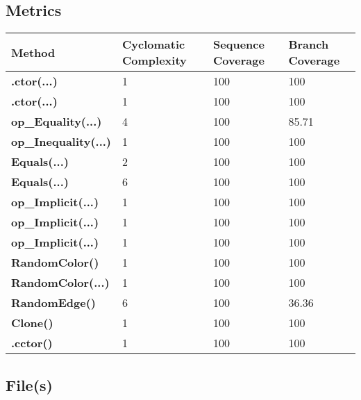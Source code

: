 \documentclass[a4paper,10pt]{article}
\begin{document}
\subsection{Metrics}
\begin{longtable}[l]{|l|l|l|l|}
\hline
\textbf{Method} & \textbf{Cyclomatic Complexity} & \textbf{Sequence Coverage} & \textbf{Branch Coverage}\\
\hline
\textbf{.ctor(...)} & 1 & 100 & 100\\
\hline
\textbf{.ctor(...)} & 1 & 100 & 100\\
\hline
\textbf{op\_Equality(...)} & 4 & 100 & 85.71\\
\hline
\textbf{op\_Inequality(...)} & 1 & 100 & 100\\
\hline
\textbf{Equals(...)} & 2 & 100 & 100\\
\hline
\textbf{Equals(...)} & 6 & 100 & 100\\
\hline
\textbf{op\_Implicit(...)} & 1 & 100 & 100\\
\hline
\textbf{op\_Implicit(...)} & 1 & 100 & 100\\
\hline
\textbf{op\_Implicit(...)} & 1 & 100 & 100\\
\hline
\textbf{RandomColor()} & 1 & 100 & 100\\
\hline
\textbf{RandomColor(...)} & 1 & 100 & 100\\
\hline
\textbf{RandomEdge()} & 6 & 100 & 36.36\\
\hline
\textbf{Clone()} & 1 & 100 & 100\\
\hline
\textbf{.cctor()} & 1 & 100 & 100\\
\hline
\end{longtable}
\subsection{File(s)}
\end{document}
